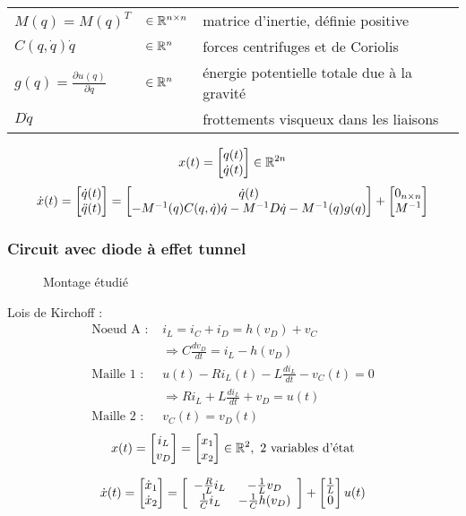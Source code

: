 \documentclass[main.tex]{subfiles}
\begin{document}
\begin{tabular}{lll}
$M(q) = M(q)^T$ & $\in \mathbb{R}^{n \times n}$ & matrice d'inertie, définie positive \\
$C(q,\dot{q})\dot{q}$ & $\in \mathbb{R}^n$ & forces centrifuges et de Coriolis\\
$g(q) = \frac{\partial u(q)}{\partial q}$ & $\in \mathbb{R}^n$ & énergie potentielle totale due à la gravité\\
$D\dot{q}$ & & frottements visqueux dans les liaisons
\end{tabular}


\[x(t) =
\begin{bmatrix} q(t) \\ \dot{q}(t) \end{bmatrix} \in \mathbb{R}^{2n}\]
\[\dot{x}(t) =
\begin{bmatrix}  \dot{q}(t) \\ \ddot{q}(t) \end{bmatrix}
=
\begin{bmatrix} \dot{q}(t) \\ -M^{-1}(q)C(q,\dot{q})\dot{q}-M^{-1}D\dot{q}-M^{-1}(q)g(q) \end{bmatrix}
+
\begin{bmatrix}  0_{n\times n} \\ M^{-1} \end{bmatrix}
\]

\subsubsection{Circuit avec diode à effet tunnel}

\begin{figure}[H]
\centering
{}
\caption{Montage étudié}
\end{figure}

Lois de Kirchoff :
\begin{align*}
\text{Noeud A : } & i_L = i_C + i_D = h(v_D) + v_C \\
& \Rightarrow  C\frac{dv_D}{dt} = i_L - h(v_D)\\
\text{Maille 1 : } & u(t) - Ri_L(t) - L\frac{di_L}{dt} -v_C(t) = 0  \\
& \Rightarrow  Ri_L + L\frac{di_L}{dt} + v_D = u(t)\\
\text{Maille 2 : } & v_C(t) = v_D(t)
\end{align*}
\[x(t) = \begin{bmatrix} 
i_L \\
v_D
 \end{bmatrix} = \begin{bmatrix} 
x_1 \\
x_2
 \end{bmatrix} \in \mathbb{R}^2,\text{ 2 variables d'état} \]

\[\dot{x}(t) =
\begin{bmatrix} 
\dot{x}_1 \\
\dot{x}_2
 \end{bmatrix}
 =
\left[
\begin{array}{cc}
-\frac{R}{L}i_L & -\frac{1}{L}v_D \\
\frac{1}{C}i_L & -\frac{1}{C}h(v_D)
\end{array}
\right]
 +
 \begin{bmatrix} 
 \frac{1}{L} \\
 0
  \end{bmatrix}
 u(t)
 \]
\end{document}
